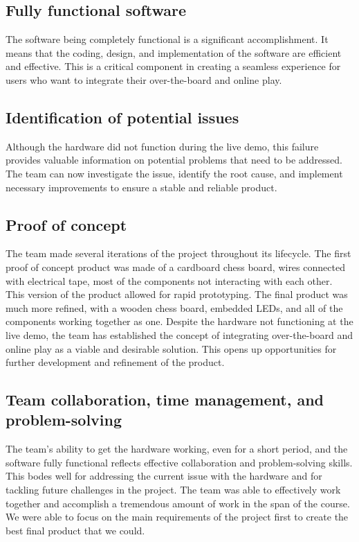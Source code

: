 \documentclass{article}
\begin{document}
\subsection{Fully functional software}
The software being completely functional is a significant accomplishment. It means that the coding, design, and implementation of the software are efficient and effective. This is a critical component in creating a seamless experience for users who want to integrate their over-the-board and online play.

\subsection{Identification of potential issues}
Although the hardware did not function during the live demo, this failure provides valuable information on potential problems that need to be addressed. The team can now investigate the issue, identify the root cause, and implement necessary improvements to ensure a stable and reliable product.

\subsection{Proof of concept}
The team made several iterations of the project throughout its lifecycle. The first proof of concept product was made of a cardboard chess board, wires connected with electrical tape, most of the components not interacting with each other. This version of the product allowed
for rapid prototyping. The final product was much more refined, with a wooden chess board, embedded LEDs, and all of the components working together as one.
Despite the hardware not functioning at the live demo, the team has established the concept of integrating over-the-board and online play as a viable and desirable solution. This opens up opportunities for further development and refinement of the product.


\subsection{Team collaboration, time management, and problem-solving}
The team's ability to get the hardware working, even for a short period, and the software fully functional reflects effective collaboration and problem-solving skills. This bodes well for addressing the current issue with the hardware and for tackling future challenges in the project.
The team was able to effectively work together and accomplish a tremendous amount of work in the span of the course. We were able to focus on the main requirements of the project first to create the best final product that we could.
\end{document}
